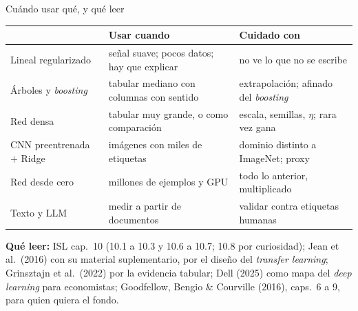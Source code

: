 \documentclass{beamer}
\newcommand{\1}{\mathbb{I}}
\begin{document}
\begin{frame}{Cuándo usar qué, y qué leer}
\small
\begin{center}
\scriptsize
\setlength{\tabcolsep}{4pt}
\renewcommand{\arraystretch}{1.1}
\begin{tabular}{lp{3.8cm}p{3.9cm}}
\hline
 & Usar cuando & Cuidado con \\
\hline
Lineal regularizado & señal suave; pocos datos; hay que explicar & no ve lo que no se escribe \\
Árboles y \emph{boosting} & tabular mediano con columnas con sentido & extrapolación; afinado del \emph{boosting} \\
Red densa & tabular muy grande, o como comparación & escala, semillas, $\eta$; rara vez gana \\
CNN preentrenada $+$ Ridge & imágenes con miles de etiquetas & dominio distinto a ImageNet; proxy \\
Red desde cero & millones de ejemplos y GPU & todo lo anterior, multiplicado \\
Texto y LLM & medir a partir de documentos & validar contra etiquetas humanas \\
\hline
\end{tabular}
\end{center}
\pause
\textbf{Qué leer:} ISL cap.\ 10 (10.1 a 10.3 y 10.6 a 10.7; 10.8 por curiosidad); Jean et al.\ (2016) con su material suplementario, por el diseño del \emph{transfer learning}; Grinsztajn et al.\ (2022) por la evidencia tabular; Dell (2025) como mapa del \emph{deep learning} para economistas; Goodfellow, Bengio \& Courville (2016), caps.\ 6 a 9, para quien quiera el fondo.
\end{frame}
\end{document}
